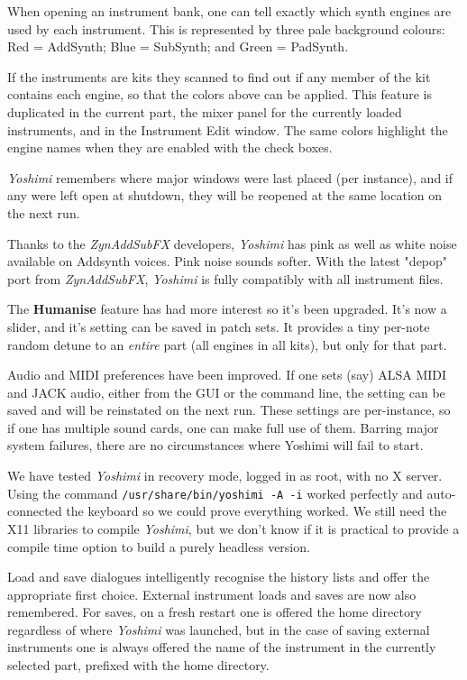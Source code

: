 \documentclass[
 11pt,
 twoside,
 a4paper,
 final                                 %
]{article}
\begin{document}
   When opening an instrument bank, one can tell exactly which synth
   engines are used by each instrument. This is represented by three pale
   background colours: Red = AddSynth; Blue = SubSynth; and Green = PadSynth.

   If the instruments are kits they scanned to find out if any member of the
   kit contains each engine, so that the colors above can be applied.
   This feature is duplicated in the current part, the mixer panel for the
   currently loaded instruments, and in the Instrument Edit window.
   The same colors highlight the engine names when they are enabled with the
   check boxes.

   \textsl{Yoshimi} remembers where major windows were last placed (per
   instance), and if any were left open at shutdown, they will be reopened at
   the same location on the next run.

   Thanks to the \textsl{ZynAddSubFX} developers, \textsl{Yoshimi} has pink
   as well as white noise available on Addsynth voices. Pink noise sounds
   softer.  With the latest "depop" port from \textsl{ZynAddSubFX},
   \textsl{Yoshimi} is fully compatibly with all instrument files.

   The \textbf{Humanise} feature has had more interest so it's been upgraded.
   It's now a slider, and it's setting can be saved in patch sets. It provides
   a tiny per-note random detune to an \textsl{entire} part (all engines in all
   kits), but only for that part.

   Audio and MIDI preferences have been improved. If one sets (say) ALSA MIDI
   and JACK audio, either from the GUI or the command line, the setting can be
   saved and will be reinstated on the next run. These settings are
   per-instance, so if one has multiple sound cards, one can make full use of
   them.  Barring major system failures, there are no circumstances where
   Yoshimi will fail to start.

   We have tested \textsl{Yoshimi} in recovery mode, logged in as root, with
   no X server. Using the command \texttt{/usr/share/bin/yoshimi -A -i}
   worked perfectly and auto-connected the keyboard so we could prove
   everything worked.  We still need the X11 libraries to compile
   \textsl{Yoshimi}, but we don't know if it is practical to provide a compile
   time option to build a purely headless version.

   Load and save dialogues intelligently recognise the history lists and offer
   the appropriate first choice. External instrument loads and saves are now
   also remembered.
   For saves, on a fresh restart one is offered the home directory regardless
   of where \textsl{Yoshimi} was launched, but in the case of saving
   external instruments one is always offered the name of the instrument
   in the currently selected part, prefixed with the home directory.
\end{document}
